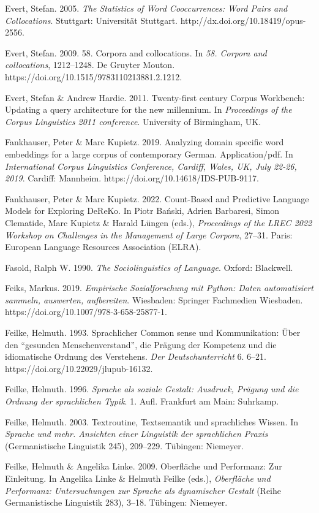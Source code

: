 Evert, Stefan. 2005. \emph{The Statistics of Word Cooccurrences: Word Pairs and Collocations}. Stuttgart: Universität Stuttgart. http://dx.doi.org/10.18419/opus-2556.

Evert, Stefan. 2009. 58. Corpora and collocations. In \emph{58. Corpora and collocations}, 1212--1248. De Gruyter Mouton. https://doi.org/10.1515/9783110213881.2.1212.

Evert, Stefan \& Andrew Hardie. 2011. Twenty-first century Corpus Workbench: Updating a query architecture for the new millennium. In \emph{Proceedings of the Corpus Linguistics 2011 conference}. University of Birmingham, UK.

Fankhauser, Peter \& Marc Kupietz. 2019. Analyzing domain specific word embeddings for a large corpus of contemporary German. Application/pdf. In \emph{International Corpus Linguistics Conference, Cardiff, Wales, UK, July 22-26, 2019}. Cardiff: Mannheim. https://doi.org/10.14618/IDS-PUB-9117.

Fankhauser, Peter \& Marc Kupietz. 2022. Count-Based and Predictive Language Models for Exploring DeReKo. In Piotr Bański, Adrien Barbaresi, Simon Clematide, Marc Kupietz \& Harald Lüngen (eds.), \emph{Proceedings of the LREC 2022 Workshop on Challenges in the Management of Large Corpora}, 27--31. Paris: European Language Resources Association (ELRA).

Fasold, Ralph W. 1990. \emph{The Sociolinguistics of Language}. Oxford: Blackwell.

Feiks, Markus. 2019. \emph{Empirische Sozialforschung mit Python: Daten automatisiert sammeln, auswerten, aufbereiten}. Wiesbaden: Springer Fachmedien Wiesbaden. https://doi.org/10.1007/978-3-658-25877-1.

Feilke, Helmuth. 1993. Sprachlicher Common sense und Kommunikation: Über den ``gesunden Menschenverstand'', die Prägung der Kompetenz und die idiomatische Ordnung des Verstehens. \emph{Der Deutschunterricht} 6. 6--21. https://doi.org/10.22029/jlupub-16132.

Feilke, Helmuth. 1996. \emph{Sprache als soziale Gestalt: Ausdruck, Prägung und die Ordnung der sprachlichen Typik}. 1. Aufl. Frankfurt am Main: Suhrkamp.

Feilke, Helmuth. 2003. Textroutine, Textsemantik und sprachliches Wissen. In \emph{Sprache und mehr. Ansichten einer Linguistik der sprachlichen Praxis} (Germanistische Linguistik 245), 209--229. Tübingen: Niemeyer.

Feilke, Helmuth \& Angelika Linke. 2009. Oberfläche und Performanz: Zur Einleitung. In Angelika Linke \& Helmuth Feilke (eds.), \emph{Oberfläche und Performanz: Untersuchungen zur Sprache als dynamischer Gestalt} (Reihe Germanistische Linguistik 283), 3--18. Tübingen: Niemeyer.

